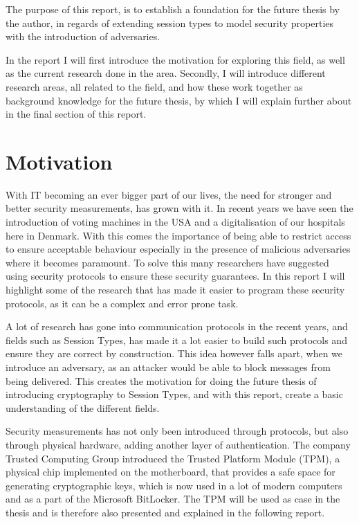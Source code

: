 \label{chap:Introduction}
The purpose of this report, is to establish a foundation for the future thesis by the author, in regards of extending session types to model security properties with the introduction of adversaries.

In the report I will first introduce the motivation for exploring this field, as well as the current research done in the area. Secondly, I will introduce different research areas, all related to the field, and how these work together as background knowledge for the future thesis, by which I will explain further about in the final section of this report. 

\section{Motivation}
With IT becoming an ever bigger part of our lives, the need for stronger and better security measurements, has grown with it. In recent years we have seen the introduction of voting machines in the USA and a digitalisation of our hospitals here in Denmark. With this comes the importance of being able to restrict access to ensure acceptable behaviour especially in the presence of malicious adversaries where it becomes paramount. To solve this many researchers have suggested using security protocols to ensure these security guarantees. In this report I will highlight some of the research that has made it easier to program these security protocols, as it can be a complex and error prone task. 

A lot of research has gone into communication protocols in the recent years, and fields such as Session Types, has made it a lot easier to build such protocols and ensure they are correct by construction. This idea however falls apart, when we introduce an adversary, as an attacker would be able to block messages from being delivered. This creates the motivation for doing the future thesis of introducing cryptography to Session Types, and with this report, create a basic understanding of the different fields. 

Security measurements has not only been introduced through protocols, but also through physical hardware, adding another layer of authentication. The company Trusted Computing Group introduced the Trusted Platform Module (TPM), a physical chip implemented on the motherboard, that provides a safe space for generating cryptographic keys, which is now used in a lot of modern computers and as a part of the Microsoft BitLocker. The TPM will be used as case in the thesis and is therefore also presented and explained in the following report. 

